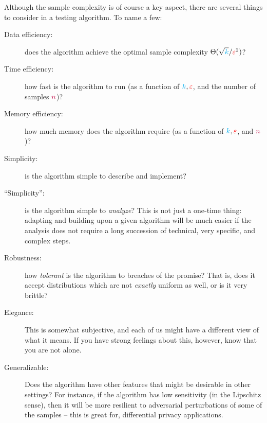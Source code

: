 Although the sample complexity is of course a key aspect, there are several things to consider in a testing algorithm. To name a few:
\begin{description}
  \item[Data efficiency:] does the algorithm achieve the optimal sample complexity $\Theta(\sqrt{{\textcolor{cyan}{k}}}/\textcolor{red}{\varepsilon}^2)$?
  \item[Time efficiency:] how fast is the algorithm to run (as a function of ${\textcolor{cyan}{k}},\textcolor{red}{\varepsilon}$, and the number of samples ${\textcolor{purple}{n}}$)?
  \item[Memory efficiency:] how much memory does the algorithm require (as a function of ${\textcolor{cyan}{k}},\textcolor{red}{\varepsilon}$, and ${\textcolor{purple}{n}}$)?
  \item[Simplicity:] is the algorithm simple to describe and implement?
  \item[``Simplicity'':] is the algorithm simple to \emph{analyze}? This is not just a one-time thing: adapting and building upon a given algorithm will be much easier if the analysis does not require a long succession of technical, very specific, and complex steps.
  \item[Robustness:] how \emph{tolerant} is the algorithm to breaches of the promise? That is, does it accept distributions which are not \emph{exactly} uniform as well, or is it very brittle?
  \item[Elegance:] This is somewhat subjective, and each of us might have a different view of what it means. If you have strong feelings about this, however, know that you are not alone.
  \item[Generalizable:] Does the algorithm have other features that might be desirable in other settings? For instance, if the algorithm has low sensitivity (in the Lipschitz sense), then it will be more resilient to adversarial perturbations of some of the samples -- this is great for, \eg differential privacy applications. 
\end{description}

